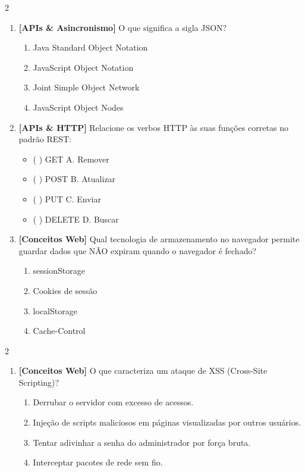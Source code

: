 \documentclass[a4paper,10pt]{article}
\begin{document}
\begin{multicols*}{2}
\begin{enumerate}[label=\textbf{\arabic*.}, resume, leftmargin=*]
\item \textbf{[APIs \& Asincronismo]} O que significa a sigla JSON?
\begin{enumerate}[label=(\alph*), noitemsep]
  \item Java Standard Object Notation
  \item JavaScript Object Notation
  \item Joint Simple Object Network
  \item JavaScript Object Nodes
\end{enumerate}

\item \textbf{[APIs \& HTTP]} Relacione os verbos HTTP às suas funções corretas no padrão REST:
\begin{itemize}[noitemsep]
  \item ( ) GET \hfill A. Remover
  \item ( ) POST \hfill B. Atualizar
  \item ( ) PUT \hfill C. Enviar
  \item ( ) DELETE \hfill D. Buscar
\end{itemize}

\item \textbf{[Conceitos Web]} Qual tecnologia de armazenamento no navegador permite guardar dados que NÃO expiram quando o navegador é fechado?
\begin{enumerate}[label=(\alph*), noitemsep]
  \item sessionStorage
  \item Cookies de sessão
  \item localStorage
  \item Cache-Control
\end{enumerate}

\end{enumerate}
\end{multicols*}
\newpage
\begin{multicols*}{2}
\begin{enumerate}[label=\textbf{\arabic*.}, resume, leftmargin=*]
\item \textbf{[Conceitos Web]} O que caracteriza um ataque de XSS (Cross-Site Scripting)?
\begin{enumerate}[label=(\alph*), noitemsep]
  \item Derrubar o servidor com excesso de acessos.
  \item Injeção de scripts maliciosos em páginas visualizadas por outros usuários.
  \item Tentar adivinhar a senha do administrador por força bruta.
  \item Interceptar pacotes de rede sem fio.
\end{enumerate}


\end{enumerate}
\end{multicols*}
\end{document}
